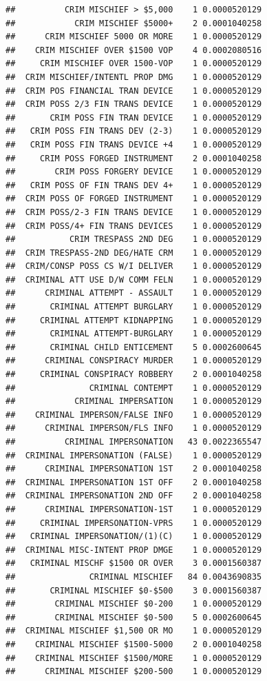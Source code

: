 \documentclass[]{book}
\begin{document}
\begin{verbatim}
##          CRIM MISCHIEF > $5,000    1 0.0000520129
##            CRIM MISCHIEF $5000+    2 0.0001040258
##      CRIM MISCHIEF 5000 OR MORE    1 0.0000520129
##    CRIM MISCHIEF OVER $1500 VOP    4 0.0002080516
##     CRIM MISCHIEF OVER 1500-VOP    1 0.0000520129
##  CRIM MISCHIEF/INTENTL PROP DMG    1 0.0000520129
##  CRIM POS FINANCIAL TRAN DEVICE    1 0.0000520129
##  CRIM POSS 2/3 FIN TRANS DEVICE    1 0.0000520129
##       CRIM POSS FIN TRAN DEVICE    1 0.0000520129
##   CRIM POSS FIN TRANS DEV (2-3)    1 0.0000520129
##   CRIM POSS FIN TRANS DEVICE +4    1 0.0000520129
##     CRIM POSS FORGED INSTRUMENT    2 0.0001040258
##        CRIM POSS FORGERY DEVICE    1 0.0000520129
##   CRIM POSS OF FIN TRANS DEV 4+    1 0.0000520129
##  CRIM POSS OF FORGED INSTRUMENT    1 0.0000520129
##  CRIM POSS/2-3 FIN TRANS DEVICE    1 0.0000520129
##  CRIM POSS/4+ FIN TRANS DEVICES    1 0.0000520129
##           CRIM TRESPASS 2ND DEG    1 0.0000520129
##  CRIM TRESPASS-2ND DEG/HATE CRM    1 0.0000520129
##  CRIM/CONSP POSS CS W/I DELIVER    1 0.0000520129
##  CRIMINAL ATT USE D/W COMM FELN    1 0.0000520129
##      CRIMINAL ATTEMPT - ASSAULT    1 0.0000520129
##       CRIMINAL ATTEMPT BURGLARY    1 0.0000520129
##     CRIMINAL ATTEMPT KIDNAPPING    1 0.0000520129
##       CRIMINAL ATTEMPT-BURGLARY    1 0.0000520129
##       CRIMINAL CHILD ENTICEMENT    5 0.0002600645
##      CRIMINAL CONSPIRACY MURDER    1 0.0000520129
##     CRIMINAL CONSPIRACY ROBBERY    2 0.0001040258
##               CRIMINAL CONTEMPT    1 0.0000520129
##            CRIMINAL IMPERSATION    1 0.0000520129
##    CRIMINAL IMPERSON/FALSE INFO    1 0.0000520129
##      CRIMINAL IMPERSON/FLS INFO    1 0.0000520129
##          CRIMINAL IMPERSONATION   43 0.0022365547
##  CRIMINAL IMPERSONATION (FALSE)    1 0.0000520129
##      CRIMINAL IMPERSONATION 1ST    2 0.0001040258
##  CRIMINAL IMPERSONATION 1ST OFF    2 0.0001040258
##  CRIMINAL IMPERSONATION 2ND OFF    2 0.0001040258
##      CRIMINAL IMPERSONATION-1ST    1 0.0000520129
##     CRIMINAL IMPERSONATION-VPRS    1 0.0000520129
##   CRIMINAL IMPERSONATION/(1)(C)    1 0.0000520129
##  CRIMINAL MISC-INTENT PROP DMGE    1 0.0000520129
##   CRIMINAL MISCHF $1500 OR OVER    3 0.0001560387
##               CRIMINAL MISCHIEF   84 0.0043690835
##       CRIMINAL MISCHIEF $0-$500    3 0.0001560387
##        CRIMINAL MISCHIEF $0-200    1 0.0000520129
##        CRIMINAL MISCHIEF $0-500    5 0.0002600645
##  CRIMINAL MISCHIEF $1,500 OR MO    1 0.0000520129
##    CRIMINAL MISCHIEF $1500-5000    2 0.0001040258
##    CRIMINAL MISCHIEF $1500/MORE    1 0.0000520129
##      CRIMINAL MISCHIEF $200-500    1 0.0000520129

\end{verbatim}
\end{document}
